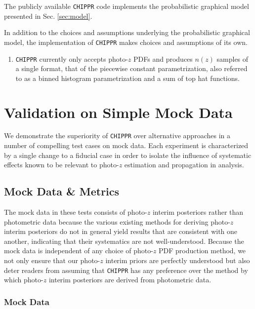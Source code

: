 \documentclass[iop]{emulateapj}
\newcommand{\chippr}{\texttt{CHIPPR} }
\begin{document}
The publicly available \chippr code implements the probabilistic graphical 
model presented in Sec. \ref{sec:model}.  

In addition to the choices and assumptions underlying the probabilistic 
graphical model, the implementation of \chippr makes choices and assumptions of 
its own.

\begin{enumerate}
	\item \chippr currently only accepts photo-$z$ PDFs and produces $n(z)$ 
samples of a single format, that of the piecewise constant parametrization, 
also referred to as a binned histogram parametrization and a sum of top hat 
functions.
\end{enumerate}

\section{Validation on Simple Mock Data}
\label{sec:validation}

We demonstrate the superiority of \chippr over alternative approaches in a 
number of compelling test cases on mock data.  Each experiment is characterized 
by a single change to a fiducial case in order to isolate the influence of 
systematic effects known to be relevant to photo-$z$ estimation and propagation 
in analysis.  

\subsection{Mock Data \& Metrics}
\label{sec:validintro}

The mock data in these tests consists of photo-$z$ interim posteriors rather 
than photometric data because the various existing methods for deriving 
photo-$z$ interim posteriors do not in general yield results that are 
consistent with one another, indicating that their systematics are not 
well-understood.  Because the mock data is independent of any choice of 
photo-$z$ PDF production method, we not only ensure that our photo-$z$ interim 
priors are perfectly understood but also deter readers from assuming that 
\chippr has any preference over the method by which photo-$z$ interim 
posteriors are derived from photometric data.

\subsubsection{Mock Data}
\label{sec:mockdata}
\end{document}

